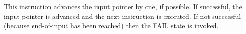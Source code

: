 This instruction advances the input pointer by one, if possible.
If successful, the input pointer is advanced and the next instruction
is executed. If not successful (because end-of-input has been reached)
then the FAIL state is invoked.
